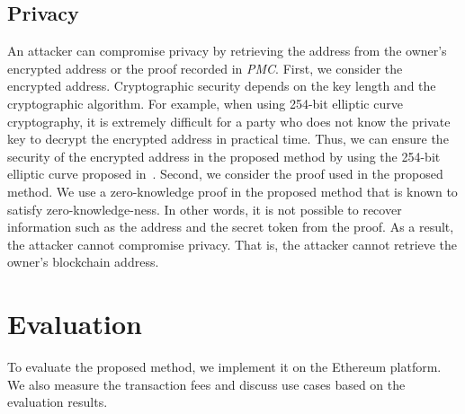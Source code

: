 \documentclass[conference]{IEEEtran}
\begin{document}
\subsection{Privacy}
An attacker can compromise privacy by retrieving the address from the owner's encrypted address or the proof recorded in \textit{PMC}.
First, we consider the encrypted address.
Cryptographic security depends on the key length and the cryptographic algorithm.
For example, when using 254-bit elliptic curve cryptography,  %
it is extremely difficult for a party who does not know the private key to decrypt the encrypted address in practical time.
Thus, we can ensure the security of the encrypted address in the proposed method by using the 254-bit elliptic curve proposed in~\cite{bjj}.
Second, we consider the proof used in the proposed method.
We use a zero-knowledge proof in the proposed method that is known to satisfy zero-knowledge-ness.
In other words, it is not possible to recover information such as the address and the secret token from the proof.
As a result, the attacker cannot compromise privacy.
That is, the attacker cannot retrieve the owner's blockchain address.


\section{Evaluation}
\label{sec:evaluation}
To evaluate the proposed method, we implement it on the Ethereum platform. %
We also measure the transaction fees and discuss use cases based on the evaluation results.
\end{document}
